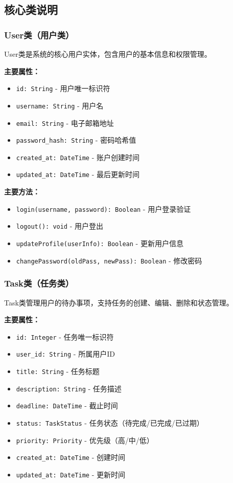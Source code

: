 \documentclass[a4paper]{article}
\begin{document}
\subsection{核心类说明}

\subsubsection{User类（用户类）}

User类是系统的核心用户实体，包含用户的基本信息和权限管理。

\textbf{主要属性：}
\begin{itemize}
    \item \texttt{id: String} - 用户唯一标识符
    \item \texttt{username: String} - 用户名
    \item \texttt{email: String} - 电子邮箱地址
    \item \texttt{password\_hash: String} - 密码哈希值
    \item \texttt{created\_at: DateTime} - 账户创建时间
    \item \texttt{updated\_at: DateTime} - 最后更新时间
\end{itemize}

\textbf{主要方法：}
\begin{itemize}
    \item \texttt{login(username, password): Boolean} - 用户登录验证
    \item \texttt{logout(): void} - 用户登出
    \item \texttt{updateProfile(userInfo): Boolean} - 更新用户信息
    \item \texttt{changePassword(oldPass, newPass): Boolean} - 修改密码
\end{itemize}

\subsubsection{Task类（任务类）}

Task类管理用户的待办事项，支持任务的创建、编辑、删除和状态管理。

\textbf{主要属性：}
\begin{itemize}
    \item \texttt{id: Integer} - 任务唯一标识符
    \item \texttt{user\_id: String} - 所属用户ID
    \item \texttt{title: String} - 任务标题
    \item \texttt{description: String} - 任务描述
    \item \texttt{deadline: DateTime} - 截止时间
    \item \texttt{status: TaskStatus} - 任务状态（待完成/已完成/已过期）
    \item \texttt{priority: Priority} - 优先级（高/中/低）
    \item \texttt{created\_at: DateTime} - 创建时间
    \item \texttt{updated\_at: DateTime} - 更新时间
\end{itemize}
\end{document}
